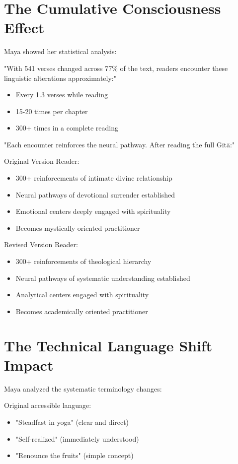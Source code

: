 \documentclass[11pt,twoside]{book}
\begin{document}
\section*{The Cumulative Consciousness Effect}
\label{sec:org7544a83}

Maya showed her statistical analysis:

"With 541 verses changed across 77\% of the text, readers encounter these linguistic alterations approximately:"
\begin{itemize}
\item Every 1.3 verses while reading
\item 15-20 times per chapter
\item 300+ times in a complete reading
\end{itemize}

"Each encounter reinforces the neural pathway. After reading the full Gītā:"

Original Version Reader:
\begin{itemize}
\item 300+ reinforcements of intimate divine relationship
\item Neural pathways of devotional surrender established
\item Emotional centers deeply engaged with spirituality
\item Becomes mystically oriented practitioner
\end{itemize}

Revised Version Reader:
\begin{itemize}
\item 300+ reinforcements of theological hierarchy
\item Neural pathways of systematic understanding established
\item Analytical centers engaged with spirituality
\item Becomes academically oriented practitioner
\end{itemize}
\section*{The Technical Language Shift Impact}
\label{sec:org876eae0}

Maya analyzed the systematic terminology changes:

Original accessible language:
\begin{itemize}
\item "Steadfast in yoga" (clear and direct)
\item "Self-realized" (immediately understood)
\item "Renounce the fruits" (simple concept)
\end{itemize}
\end{document}
